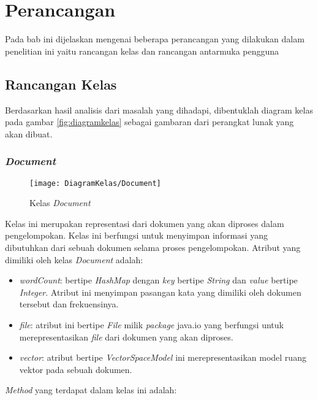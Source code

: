 \chapter{Perancangan}
\label{chap:perancangan}

Pada bab ini dijelaskan mengenai beberapa perancangan yang dilakukan dalam penelitian ini yaitu rancangan kelas dan rancangan antarmuka pengguna

\section{Rancangan Kelas}
Berdasarkan hasil analisis dari masalah yang dihadapi, dibentuklah diagram kelas pada gambar \ref{fig:diagramkelas} sebagai gambaran dari perangkat lunak yang akan dibuat.

\subsection{\textit{Document}}

\begin{figure}[h]
	\begin{center}
		\texttt{[image: DiagramKelas/Document]}
		\caption{Kelas \textit{Document}}
		\label{fig:kelasDocument}
	\end{center}
\end{figure}

Kelas ini merupakan representasi dari dokumen yang akan diproses dalam pengelompokan. Kelas ini berfungsi untuk menyimpan informasi yang dibutuhkan dari sebuah dokumen selama proses pengelompokan. Atribut yang dimiliki oleh kelas \textit{Document} adalah:

\begin{itemize}
	\item \textit{wordCount}: bertipe \textit{HashMap} dengan \textit{key} bertipe \textit{String} dan \textit{value} bertipe \textit{Integer}. Atribut ini menyimpan pasangan kata yang dimiliki oleh dokumen tersebut dan frekuensinya.
	\item \textit{file}: atribut ini bertipe \textit{File} milik \textit{package} java.io yang berfungsi untuk merepresentasikan \textit{file} dari dokumen yang akan diproses.
	\item \textit{vector}: atribut bertipe \textit{VectorSpaceModel} ini merepresentasikan model ruang vektor pada sebuah dokumen.
\end{itemize}

\textit{Method} yang terdapat dalam kelas ini adalah:


